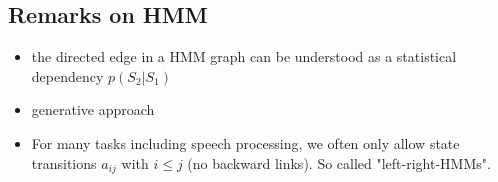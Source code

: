 \subsection*{Remarks on HMM}

\begin{itemize}
    \item the directed edge in a HMM graph can be understood as a statistical dependency $p(S_2|S_1)$
    \item generative approach
    \item For many tasks including speech processing, we often only allow state transitions $a_{ij}$ with $i \le j$ (no backward links). So called "left-right-HMMs".
\end{itemize}
